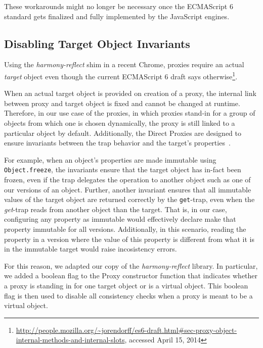 These workarounds might no longer be necessary once the ECMAScript 6 standard gets finalized and fully implemented by the JavaScript engines. 


\subsection{Disabling Target Object Invariants}


Using the \emph{harmony-reflect} shim in a recent Chrome, proxies require an actual \emph{target} object even though the current ECMAScript 6 draft says otherwise\footnote{\url{http://people.mozilla.org/~jorendorff/es6-draft.html\#sec-proxy-object-internal-methods-and-internal-slots}, accessed April 15, 2014}.

When an actual target object is provided on creation of a proxy, the internal link between proxy and target object is fixed and cannot be changed at runtime.
Therefore, in our use case of the proxies, in which proxies stand-in for a group of objects from which one is chosen dynamically, the proxy is still linked to a particular object by default.
Additionally, the Direct Proxies are designed to ensure invariants between the trap behavior and the target's properties~\cite{Cutsem2013TRP}.

For example, when an object's properties are made immutable using \lstinline{Object.freeze}, the invariants ensure that the target object has in-fact been frozen, even if the trap delegates the operation to another object such as one of our versions of an object.
Further, another invariant ensures that all immutable values of the target object are returned correctly by the \lstinline{get}-trap, even when the \emph{get}-trap reads from another object than the target. 
That is, in our case, configuring any property as immutable would effectively declare make that property immutable for all versions.
Additionally, in this scenario, reading the property in a version where the value of this property is different from what it is in the immutable target would raise incosistency errors.

For this reason, we adapted our copy of the \emph{harmony-reflect} library.
In particular, we added a boolean flag to the Proxy constructor function that indicates whether a proxy is standing in for one target object or is a virtual object.
This boolean flag is then used to disable all consistency checks when a proxy is meant to be a virtual object.


